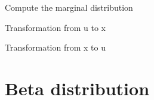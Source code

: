 \documentclass[letterpaper,10pt,english]{sphinxmanual}
\begin{document}
\begin{fulllineitems}
\begin{fulllineitems}
Compute the marginal distribution

\end{fulllineitems}



\begin{fulllineitems}
Transformation from u to x

\end{fulllineitems}



\begin{fulllineitems}
Transformation from x to u

\end{fulllineitems}


\end{fulllineitems}



\section{Beta distribution}
\label{distributions:beta-distribution}
\end{document}
